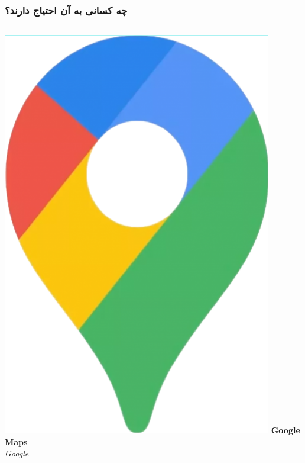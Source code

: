 \documentclass{beamer}
\begin{document}
\begin{frame}
  \frametitle{چه کسانی به آن احتیاج دارند؟}
  \begin{columns}
    \includegraphics[height=0.5\textheight]{./img/google-maps.png}
    \textbf{Google Maps}\\
    \textit{Google}

\end{columns}
\end{frame}
\end{document}
